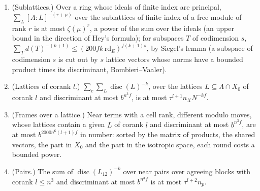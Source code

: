 \begin{theorem}[Counting]\label{thm:frame-count}
\begin{enumerate}[label=\textup{(\alph*)}]
\item (Sublattices.) Over a ring whose ideals of finite index are principal, $\sum_L[\Lambda:L]^{-(r+\mu)}$ over the sublattices of finite index of a free module of rank $r$ is at most $\zeta(\mu)^r$, a power of the
sum over the ideals (an upper bound in the direction of Hey's formula); for subspaces $T$ of codimension $s$, $\sum_Td(T)^{-(k+1)}\le(200fk\,\mathrm{rd}_E)^{f(k+1)s}$, by Siegel's lemma (a subspace of codimension $s$
is cut out by $s$ lattice vectors whose norms have a bounded product times its discriminant, Bombieri--Vaaler).
\item (Lattices of corank $l$.) $\sum_c\sum_L\operatorname{disc}(L)^{-k}$, over the lattices $L\subseteq\Lambda\cap X_0$ of corank $l$ and discriminant at most $b^{n^3f}$, is at most $\tau^{l+1}n_XN^{-kf}$.
\item (Frames over a lattice.) Near terms with a cell rank, different modulo moves, whose lattices contain a given $L$ of corank $l$ and discriminant at most $b^{n^3f}$, are at most $b^{2000n^6(l+1)f}$
in number: sorted by the matrix of products, the shared vectors, the part in $X_0$ and the part in the isotropic space, each round costs a bounded power.
\item (Pairs.) The sum of $\operatorname{disc}(L_{12})^{-k}$ over near pairs over agreeing blocks with corank $l\le n^3$ and discriminant at most $b^{n^3f}$ is at most $\tau^{l+2}n_p$.
\end{enumerate}
\end{theorem}

